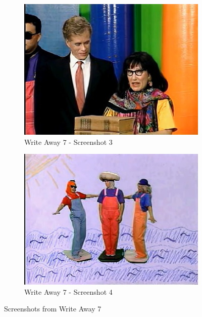 \begin{figure}[H]
    \begin{subfigure}{0.45\textwidth}
        \centering
        \includegraphics[width=\linewidth]{Games/WriteAway/Images/WriteAway7Screenshot3.png}
        \caption{Write Away 7 - Screenshot 3}
    \end{subfigure}
    \begin{subfigure}{0.45\textwidth}
        \centering
        \includegraphics[width=\linewidth]{Games/WriteAway/Images/WriteAway7Screenshot4.png}
        \caption{Write Away 7 - Screenshot 4}
    \end{subfigure}
    \caption{Screenshots from Write Away 7}
\end{figure}
